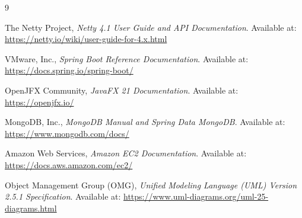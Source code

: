 \documentclass[11pt,a4paper]{report}
\begin{document}
\begin{thebibliography}{9}

The Netty Project, \textit{Netty 4.1 User Guide and API Documentation}. Available at: \url{https://netty.io/wiki/user-guide-for-4.x.html}

VMware, Inc., \textit{Spring Boot Reference Documentation}. Available at: \url{https://docs.spring.io/spring-boot/}

OpenJFX Community, \textit{JavaFX 21 Documentation}. Available at: \url{https://openjfx.io/}

MongoDB, Inc., \textit{MongoDB Manual and Spring Data MongoDB}. Available at: \url{https://www.mongodb.com/docs/}

Amazon Web Services, \textit{Amazon EC2 Documentation}. Available at: \url{https://docs.aws.amazon.com/ec2/}

Object Management Group (OMG), \textit{Unified Modeling Language (UML) Version 2.5.1 Specification}. Available at: \url{https://www.uml-diagrams.org/uml-25-diagrams.html}

\end{thebibliography}
\end{document}
